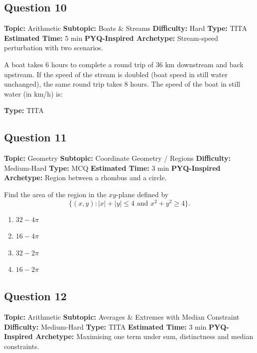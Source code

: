 \documentclass[11pt]{article}
\begin{document}
\subsection*{Question 10}
\textbf{Topic:} Arithmetic \quad
\textbf{Subtopic:} Boats \& Streams \quad
\textbf{Difficulty:} Hard \quad
\textbf{Type:} TITA \quad
\textbf{Estimated Time:} 5 min \quad
\textbf{PYQ-Inspired Archetype:} Stream-speed perturbation with two scenarios.

\begin{tcolorbox}
A boat takes 6 hours to complete a round trip of 36 km downstream and back upstream. If the speed of the stream is doubled (boat speed in still water unchanged), the same round trip takes 8 hours. The speed of the boat in still water (in km/h) is:
\end{tcolorbox}

\textbf{Type:} TITA

\subsection*{Question 11}
\textbf{Topic:} Geometry \quad
\textbf{Subtopic:} Coordinate Geometry / Regions \quad
\textbf{Difficulty:} Medium-Hard \quad
\textbf{Type:} MCQ \quad
\textbf{Estimated Time:} 3 min \quad
\textbf{PYQ-Inspired Archetype:} Region between a rhombus and a circle.

\begin{tcolorbox}
Find the area of the region in the \(xy\)-plane defined by
\[
\{(x,y) : |x| + |y| \le 4 \text{ and } x^{2} + y^{2} \ge 4\}.
\]
\end{tcolorbox}

\begin{enumerate}[label=(\Alph*)]
\item \(32 - 4\pi\)
\item \(16 - 4\pi\)
\item \(32 - 2\pi\)
\item \(16 - 2\pi\)
\end{enumerate}

\subsection*{Question 12}
\textbf{Topic:} Arithmetic \quad
\textbf{Subtopic:} Averages \& Extremes with Median Constraint \quad
\textbf{Difficulty:} Medium-Hard \quad
\textbf{Type:} TITA \quad
\textbf{Estimated Time:} 3 min \quad
\textbf{PYQ-Inspired Archetype:} Maximising one term under sum, distinctness and median constraints.
\end{document}
